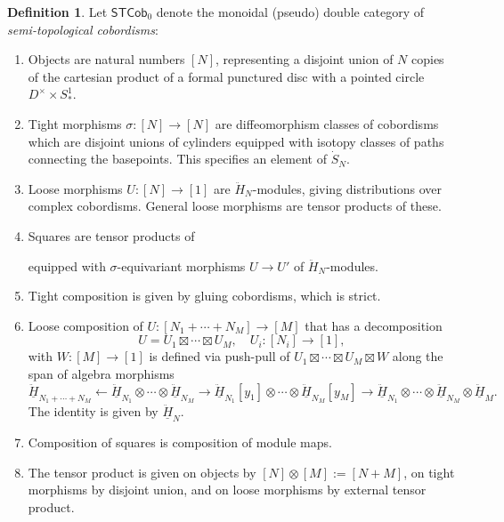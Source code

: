 \documentclass[11pt]{report}
\theoremstyle{definition}
\newtheorem{definition}[theorem]{Definition}
\theoremstyle{remark}
\theoremstyle{remark}
\newcommand{\id}{\textnormal{id}}
\begin{document}
\begin{definition}
Let $\mathsf{STCob}_0$ denote the monoidal (pseudo) double category of \emph{semi-topological cobordisms}:
\begin{enumerate}[label=(\roman*)]
\item Objects are natural numbers $[N]$, representing a disjoint union of $N$ copies of the cartesian product of a formal punctured disc with a pointed circle $D^\times \times S_*^1$.
\item Tight morphisms $\sigma: [N] \to [N]$ are diffeomorphism classes of cobordisms which are disjoint unions of cylinders equipped with isotopy classes of paths connecting the basepoints. This specifies an element of $\dot S_N$.
\item Loose morphisms $U: [N] \to [1]$ are $\ddot H_N$-modules, giving distributions over complex cobordisms. General loose morphisms are tensor products of these.
\item Squares are tensor products of
\begin{center}
\end{center}
equipped with $\sigma$-equivariant morphisms $U \to U'$ of $\ddot H_N$-modules.
\item Tight composition is given by gluing cobordisms, which is strict.
\item Loose composition of $U: [N_1+\cdots+N_M] \to [M]$ that has a decomposition
\begin{equation*}
U = U_1 \boxtimes \cdots \boxtimes U_M, \quad U_i: [N_i] \to [1],
\end{equation*}
with $W: [M] \to [1]$ is defined via push-pull of $U_1 \boxtimes \cdots \boxtimes U_M \boxtimes W$ along the span of algebra morphisms
\begin{equation*}
\underline{\ddot H}_{N_1+\cdots+N_M} \leftarrow \underline{\ddot H}_{N_1} \otimes \cdots \otimes \underline{\ddot H}_{N_M} \to \underline{\ddot H}_{N_1}[y_1] \otimes \cdots \otimes \underline{\ddot H}_{N_M}[y_M] \to \underline{\ddot H}_{N_1} \otimes  \cdots \otimes \underline{\ddot H}_{N_M} \otimes \underline{\ddot H}_M.
\end{equation*}
The identity is given by $\underline{\ddot H}_N$.
\item Composition of squares is composition of module maps.
\item The tensor product is given on objects by $[N] \otimes [M] := [N+M]$, on tight morphisms by disjoint union, and on loose morphisms by external tensor product.
\end{enumerate}
\end{definition}
\end{document}
